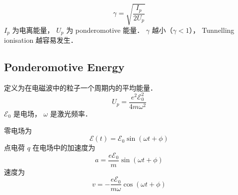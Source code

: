 
\begin{equation}
\gamma = \sqrt{\frac{I_p}{2U_p}}
\end{equation}
$I_p$ 为电离能量， $U_p$ 为 ponderomotive 能量． $\gamma$ 越小（$\gamma < 1$）， Tunnelling ionisation 越容易发生．

\subsection{Ponderomotive Energy}
定义为在电磁波中的粒子一个周期内的平均能量．
\begin{equation}
U_p = \frac{e^2 \mathcal E_0^2}{4m\omega^2}
\end{equation}
$\mathcal E_0$ 是电场， $\omega$ 是激光频率．

零电场为
\begin{equation}
\mathcal E(t) = \mathcal E_0 \sin(\omega t + \phi)
\end{equation}
点电荷 $q$ 在电场中的加速度为
\begin{equation}
a = \frac{e\mathcal E_0}{m} \sin(\omega t + \phi)
\end{equation}
速度为
\begin{equation}
v = -\frac{e\mathcal E_0}{m\omega} \cos(\omega t + \phi)
\end{equation}
